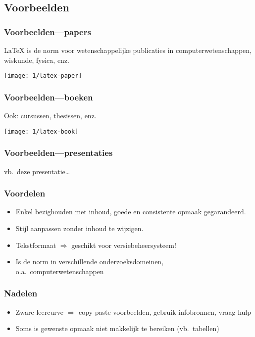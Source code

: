\documentclass[aspectratio=169]{beamer}
\begin{document}
\subsection{Voorbeelden}

\begin{frame}
  \frametitle{Voorbeelden---papers}

  {\LaTeX} is de norm voor wetenschappelijke publicaties in computerwetenschappen, wiskunde, fysica, enz.

  \begin{center}
    \texttt{[image: 1/latex-paper]}
  \end{center}

\end{frame}

\begin{frame}
  \frametitle{Voorbeelden---boeken}

  Ook: cursussen, thesissen, enz.

  \begin{center}
    \texttt{[image: 1/latex-book]}
  \end{center}

\end{frame}

\begin{frame}
  \frametitle{Voorbeelden---presentaties}

  \begin{center}
    vb.\ deze presentatie\ldots
  \end{center}

\end{frame}

\begin{frame}
  \frametitle{Voordelen}

  \begin{itemize}
    \item<+-> Enkel bezighouden met inhoud, goede en consistente opmaak gegarandeerd.
    \item<+-> Stijl aanpassen zonder inhoud te wijzigen.
    \item<+-> Tekstformaat \(\Rightarrow\) geschikt voor versiebeheersysteem!
    \item<+-> Is de norm in verschillende onderzoeksdomeinen, o.a.\ computerwetenschappen
  \end{itemize}
\end{frame}


\begin{frame}
  \frametitle{Nadelen}

  \begin{itemize}
    \item<+-> Zware leercurve \(\Rightarrow\) copy paste voorbeelden, gebruik infobronnen, vraag hulp
    \item<+-> Soms is gewenste opmaak niet makkelijk te bereiken (vb.~tabellen)
  \end{itemize}

\end{frame}
\end{document}
